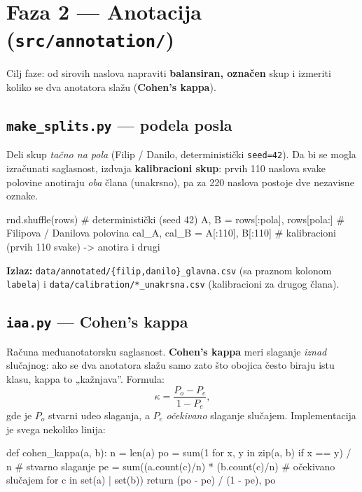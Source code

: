 \documentclass[11pt,a4paper]{article}
\newcommand{\kod}[1]{\texttt{#1}}
\begin{document}
\section{Faza 2 --- Anotacija (\texttt{src/annotation/})}
Cilj faze: od sirovih naslova napraviti \textbf{balansiran, označen} skup i izmeriti
koliko se dva anotatora slažu (\textbf{Cohen's kappa}).

\subsection{\texttt{make\_splits.py} --- podela posla}
Deli skup \emph{tačno na pola} (Filip / Danilo, deterministički \kod{seed=42}). Da bi
se mogla izračunati saglasnost, izdvaja \textbf{kalibracioni skup}: prvih 110 naslova
svake polovine anotiraju \emph{oba} člana (unakrsno), pa za 220 naslova postoje dve
nezavisne oznake.

\begin{code}
rnd.shuffle(rows)                  # deterministički (seed 42)
A, B = rows[:pola], rows[pola:]    # Filipova / Danilova polovina
cal_A, cal_B = A[:110], B[:110]    # kalibracioni (prvih 110 svake) -> anotira i drugi
\end{code}

\textbf{Izlaz:} \kod{data/annotated/\{filip,danilo\}\_glavna.csv} (sa praznom kolonom
\kod{labela}) i \kod{data/calibration/*\_unakrsna.csv} (kalibracioni za drugog člana).

\subsection{\texttt{iaa.py} --- Cohen's kappa}
Računa međuanotatorsku saglasnost. \textbf{Cohen's kappa} meri slaganje \emph{iznad}
slučajnog: ako se dva anotatora slažu samo zato što obojica često biraju istu klasu,
kappa to „kažnjava''. Formula:
\[
\kappa = \frac{P_o - P_e}{1 - P_e},
\]
gde je $P_o$ stvarni udeo slaganja, a $P_e$ \emph{očekivano} slaganje slučajem.
Implementacija je svega nekoliko linija:

\begin{code}
def cohen_kappa(a, b):
    n = len(a)
    po = sum(1 for x, y in zip(a, b) if x == y) / n          # stvarno slaganje
    pe = sum((a.count(c)/n) * (b.count(c)/n)                  # očekivano slučajem
             for c in set(a) | set(b))
    return (po - pe) / (1 - pe), po
\end{code}
\end{document}
